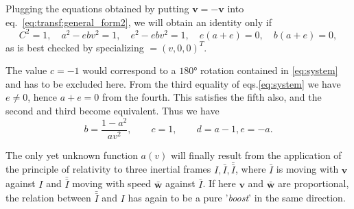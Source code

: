 Plugging the equations obtained by putting $ \mathbf{v} = -\mathbf{v} $ into eq.~\eqref{eq:transf:general_form2}, we will obtain an identity only if
\begin{equation}
C^2=1, \quad a^2-ebv^2=1,\quad e^2-ebv^2=1,\quad e(a+e)=0,\quad b(a+e)=0,
\label{eq:system}
\end{equation}
as is best checked by specializing $ \mathbf = (v, 0, 0)^T $.

The value $ c = -1 $ would correspond to a $ 180° $ rotation contained in \eqref{eq:system} and has to be excluded here. From the third equality of eqs.\eqref{eq:system} we have $ e\neq 0 $, hence $ a + e = 0 $ from the fourth. This satisfies the fifth also, and the second and third become equivalent. Thus we have 
\begin{equation}
b=\frac{1-a^2}{av^2}, \qquad c=1,\qquad d=a-1, e=-a.
\end{equation}

The only yet unknown function $ a( v) $ will finally result from the application of the principle of relativity to three inertial frames $ I, \bar{I}, \bar{\bar{I}} $, where $ \bar{I} $ is moving with $ \mathbf{v} $ against $ I $ and $ \bar{\bar{I}} $ moving with speed $ \mathbf{\bar{w}} $ against $ \bar{I} $. If here $ \mathbf{v} $ and $ \mathbf{\bar{w}} $ are proportional, the relation
between $ \bar{\bar{I}} $ and $ I $ has again to be a pure '\emph{boost}' in the same direction.


